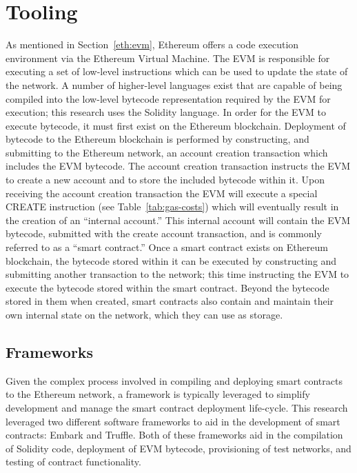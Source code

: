 \section{Tooling}
As mentioned in Section~\ref{eth:evm}, Ethereum offers a code execution
environment via the Ethereum Virtual Machine. The EVM is responsible for
executing a set of low-level instructions which can be used to update the state
of the network.\cite{ethereum-yellow} A number of higher-level languages exist
that are capable of being compiled into the low-level bytecode representation
required by the EVM for execution; this research uses the Solidity language. In
order for the EVM to execute bytecode, it must first exist on the Ethereum
blockchain. Deployment of bytecode to the Ethereum blockchain is performed by
constructing, and submitting to the Ethereum network, an account creation
transaction which includes the EVM bytecode. The account creation transaction
instructs the EVM to create a new account and to store the included bytecode
within it. Upon receiving the account creation transaction the EVM will execute
a special {\tiny{CREATE}} instruction (see Table~\ref{tab:gas-costs}) which
will eventually result in the creation of an ``internal account.'' This
internal account will contain the EVM bytecode, submitted with the create
account transaction, and is commonly referred to as a ``smart contract.'' Once
a smart contract exists on Ethereum blockchain, the bytecode stored within it
can be executed by constructing and submitting another transaction to the
network; this time instructing the EVM to execute the bytecode stored within
the smart contract. Beyond the bytecode stored in them when created, smart
contracts also contain and maintain their own internal state on the network,
which they can use as storage.

\subsection{Frameworks}
Given the complex process involved in compiling and deploying smart contracts to
the Ethereum network, a framework is typically leveraged to simplify development
and manage the smart contract deployment life-cycle. This research leveraged two
different software frameworks to aid in the development of smart contracts:
Embark and Truffle. Both of these frameworks aid in the compilation of Solidity
code, deployment of EVM bytecode, provisioning of test networks, and testing of
contract functionality.

